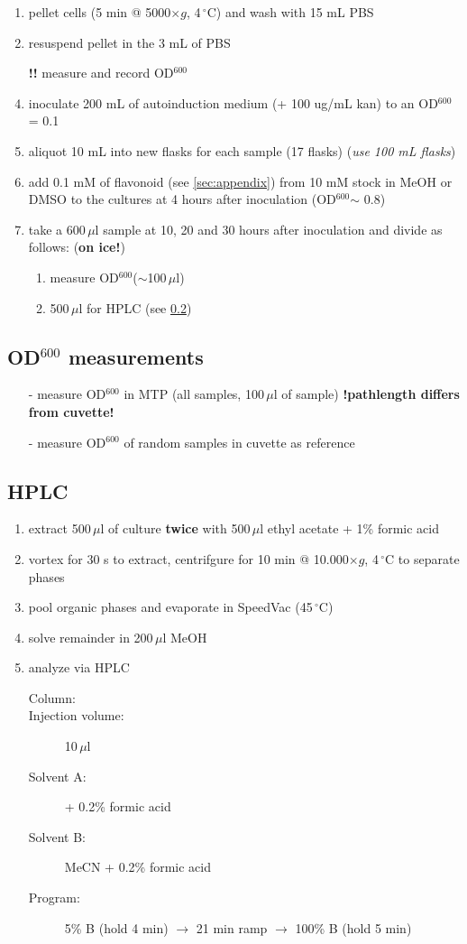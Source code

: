\documentclass{scrartcl}\usepackage[]{graphicx}\usepackage[]{color}
\newcommand{\degC}{\protect$\,^\circ$C\xspace}
\newcommand{\ul}{\protect\,$\mu$l\xspace}
\newcommand{\ra}{$\rightarrow$\xspace}
\newcommand{\od}{OD$^{600}$\xspace}
\begin{document}
\begin{enumerate}[label=\arabic*)]
\item pellet cells (5 min @ 5000$\times g$, 4\degC) and wash with 15 mL PBS
\item resuspend pellet in the 3 mL of PBS
\item[\textbf{!!}]measure and record \od
\item inoculate 200 mL of autoinduction medium (+ 100 ug/mL kan) to an \od= 0.1
\item aliquot 10 mL into new flasks for each sample (17 flasks) (\emph{use 100 mL flasks})
\item add 0.1 mM of flavonoid (see \ref{sec:appendix}) from 10 mM stock in MeOH or DMSO to the cultures at 4 hours after inoculation (\od $\sim$ 0.8)
\vspace{0.5cm}
\item take a 600\ul sample at 10, 20 and 30 hours after inoculation and divide as follows: (\textbf{on ice!})
\begin{enumerate}[label=\alph*)]
\item measure \od ($\sim$100\ul)
\item 500\ul for HPLC (see \ref{sec:HPLC}) 
\end{enumerate}
\end{enumerate}

\subsection{\od measurements}
\begin{itemize}
\item[-]measure \od in MTP (all samples, 100\ul of sample) \textbf{!pathlength differs from cuvette!}
\item[-]measure \od of random samples in cuvette as reference
\end{itemize}

\subsection{HPLC}
\label{sec:HPLC}
\begin{enumerate}
\item extract 500\ul of culture \textbf{twice} with 500\ul ethyl acetate + 1\% formic acid
\item vortex for 30 s to extract, centrifgure for 10 min @ 10.000$\times g$, 4\degC to separate phases
\item pool organic phases and evaporate in SpeedVac (45\degC)
\item solve remainder in 200\ul MeOH
\item analyze via HPLC
\begin{description}
\item[Column:]
\item[Injection volume:] 10\ul
\item[Solvent A:]  + 0.2\% formic acid
\item[Solvent B:] MeCN + 0.2\% formic acid
\item[Program:] 5\% B (hold 4 min) \ra 21 min ramp \ra 100\% B (hold 5 min)
\end{description}
\end{enumerate}
\end{document}
